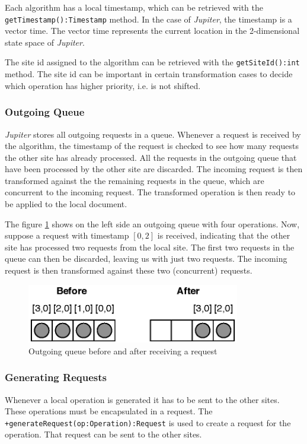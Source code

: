 Each algorithm has a local timestamp, which can be retrieved with the
\texttt{getTimestamp():Timestamp} method. In the 
case of \emph{Jupiter}, the timestamp is a vector time. The vector 
time represents the current location in the 2-dimensional state space of 
\emph{Jupiter}. 

The site id assigned to the algorithm can be retrieved with the
\texttt{getSiteId():int} method. The site id can be important in certain
transformation cases to decide which operation has higher priority, i.e.
is not shifted.

\subsubsection{Outgoing Queue}
\label{sect:algorithm.outgoingqueue}
\emph{Jupiter} stores all outgoing requests in a queue. Whenever a request
is received by the algorithm, the timestamp of the request is checked to
see how many requests the other site has already processed. All the requests
in the outgoing queue that have been processed by the other site are discarded.
The incoming request is then transformed against the the remaining 
requests in the queue, which are concurrent to the incoming request. 
The transformed operation is then ready to be applied to the
local document.

The figure \ref{fig:algorithm.outqueue} shows on the left side an outgoing
queue with four operations. Now, suppose a request with timestamp $[0,2]$
is received, indicating that the other site has processed two requests
from the local site. The first two requests in the queue can then be
discarded, leaving us with just two requests. The incoming request is then
transformed against these two (concurrent) requests.

\begin{figure}[H]
\centering
\includegraphics[width=9.31cm,height=2.58cm]{../images/finalreport/algorithm_outqueue.eps}
\caption{Outgoing queue before and after receiving a request}
\label{fig:algorithm.outqueue}
\end{figure}

\subsubsection{Generating Requests}
Whenever a local operation is generated it has to be sent to the other sites.
These operations must be encapsulated in a request. The
\texttt{+generate\-Request(op:Operation):Request} is used to create a request
for the operation. That request can be sent to the other sites.

